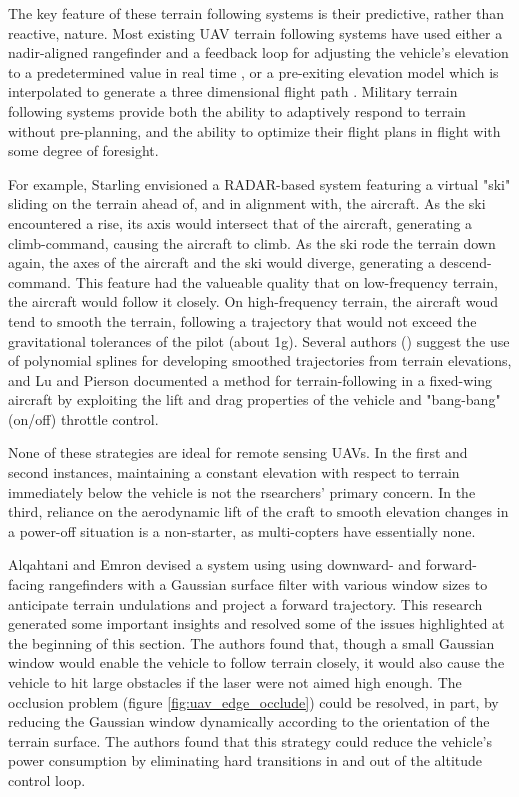 \documentclass[10pt]{report}
\begin{document}
The key feature of these terrain following systems is their predictive, rather than reactive, nature. Most existing UAV terrain following systems have used either a nadir-aligned rangefinder and a feedback loop for adjusting the vehicle's elevation to a predetermined value in real time \cite{ArduPilot2017}, or a pre-exiting elevation model which is interpolated to generate a three dimensional flight path \cite{ArduPilot2017,Samar2011}. Military terrain following systems provide both the ability to adaptively respond to terrain without pre-planning, and the ability to optimize their flight plans in flight with some degree of foresight. 

For example, Starling \cite{Starling1971} envisioned a RADAR-based system featuring a virtual "ski" sliding on the terrain ahead of, and in alignment with, the aircraft. As the ski encountered a rise, its axis would intersect that of the aircraft, generating a climb-command, causing the aircraft to climb. As the ski rode the terrain down again, the axes of the aircraft and the ski would diverge, generating a descend-command. This feature had the valueable quality that on low-frequency terrain, the aircraft would follow it closely. On high-frequency terrain, the aircraft woud tend to smooth the terrain, following a trajectory that would not exceed the gravitational tolerances of the pilot (about 1g). Several authors (\cite{MENON1991,Popovic2017,Lu1995,Rahim2011,Samar2011}) suggest the use of polynomial splines for developing smoothed trajectories from terrain elevations, and Lu and Pierson \cite{Lu1995} documented a method for terrain-following in a fixed-wing aircraft by exploiting the lift and drag properties of the vehicle and "bang-bang" (on/off) throttle control. 

None of these strategies are ideal for remote sensing UAVs. In the first and second instances, maintaining a constant elevation with respect to terrain immediately below the vehicle is not the rsearchers' primary concern. In the third, reliance on the aerodynamic lift of the craft to smooth elevation changes in a power-off situation is a non-starter, as multi-copters have essentially none.

Alqahtani and Emron \cite{Alqahtani2018} devised a system using using downward- and forward-facing rangefinders with a Gaussian surface filter with various window sizes to anticipate terrain undulations and project a forward trajectory. This research generated some important insights and resolved some of the issues highlighted at the beginning of this section. The authors found that, though a small Gaussian window would enable the vehicle to follow terrain closely, it would also cause the vehicle to hit large obstacles if the laser were not aimed high enough. The occlusion problem (figure \ref{fig:uav_edge_occlude}) could be resolved, in part, by reducing the Gaussian window dynamically according to the orientation of the terrain surface. The authors found that this strategy could reduce the vehicle's power consumption by eliminating hard transitions in and out of the altitude control loop.
\end{document}
